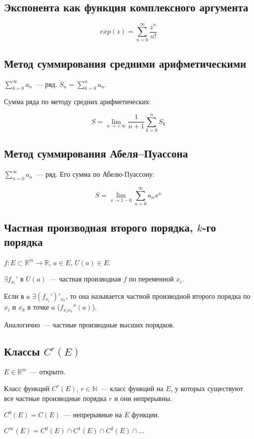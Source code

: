 \documentclass[paper=a4, fontsize=11pt]{article}
\begin{document}
\subsection{Экспонента как функция комплексного аргумента}
$$exp(z) = \sum_{n=0}^{\infty} \frac{z^n}{n!}$$

\subsection{Метод суммирования средними арифметическими}
$\sum_{k=0}^{\infty} a_n$~--- ряд. $S_n = \sum_{k=0}^{n} a_n$.

Сумма ряда по методу средних арифметических:

$$S = \lim_{n \to +\infty} \frac{1}{n+1} \sum_{k=0}^{n} S_k$$

\subsection{Метод суммирования Абеля--Пуассона}
$\sum_{n=0}^{\infty}a_n$~--- ряд. Его сумма по Абелю-Пуассону:

$$S = \lim_{x \to 1-0} \sum_{n=0}^{\infty} a_n x^n$$

\subsection{Частная производная второго порядка, $k$-го порядка}
$f: E \subset \mathds{R}^m \rightarrow \mathds{R}$, $a \in E$, $U(a) \in E$.

$\exists f_{x_i}'$ в $U(a)$~--- частная производная $f$ по переменной $x_i$.

Если в $a$ $\exists (f_{x_i}')'_{x_k}$, то она называется частной производной второго порядка по $x_i$ и $x_k$ в точке $a$
($f_{x_ix_k}''(a)$).

Аналогично~--- частные производные высших порядков.

\subsection{Классы $C^r(E)$}
$E \in \mathds{R}^m$~--- открыто.

Класс функций $C^r(E)$, $r \in \mathds{N}$~--- класс функций на $E$, у которых существуют все частные производные порядка $r$ и они непрерывны.

$C^0(E) = C(E)$~--- непрерывные на $E$ функции.

$C^{\infty}(E) = C^0(E) \cap C^1(E) \cap C^2(E) \cap \dots$
\end{document}
